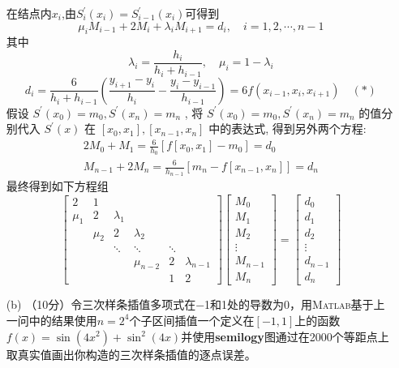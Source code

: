 \documentclass[12pt,a4paper,utf8]{ctexart}
\begin{document}
\begin{enumerate}
		在结点内$x_{i}$,由$S_{i}^{\prime}\left(x_{i}\right)=S_{i-1}^{\prime}\left(x_{i}\right)$可得到\\
		$$\mu_{i} M_{i-1}+2 M_{i}+\lambda_{i} M_{i+1}=d_{i}, \quad i=1,2, \cdots, n-1$$
		其中$$
		\lambda_{i}=\frac{h_{i}}{h_{i}+h_{i-1}}, \quad \mu_{i}=1-\lambda_{i}$$
		$$
		d_{i}=\frac{6}{h_{i}+h_{i-1}}\left(\frac{y_{i+1}-y_{i}}{h_{i}}-\frac{y_{i}-y_{i-1}}{h_{i-1}}\right)=6 f\left(x_{i-1}, x_{i}, x_{i+1}\right)\quad (*)
		$$
		假设 $S^{\prime}\left(x_{0}\right)=m_{0}, S^{\prime}\left(x_{n}\right)=m_{n}$ , 将 $S^{\prime}\left(x_{0}\right)=m_{0}, S^{\prime}\left(x_{n}\right)=m_{n}$ 的值分
		别代入 $S^{\prime}(x)$ 在 $\left[x_{0}, x_{1}\right],\left[x_{n-1}, x_{n}\right]$ 中的表达式, 得到另外两个方程:
		$$
		\begin{array}{c}
			2 M_{0}+M_{1}=\frac{6}{h_{0}}\left[f\left[x_{0}, x_{1}\right]-m_{0}\right]=d_{0} \\
			M_{n-1}+2 M_{n}=\frac{6}{h_{n-1}}\left[m_{n}-f\left[x_{n-1}, x_{n}\right]\right]=d_{n}
		\end{array}
		$$
		最终得到如下方程组
		\[
		\left[\begin{array}{cccccc}
			2 & 1 & & & & \\
			\mu_{1} & 2 & \lambda_{1} & & & \\
			& \mu_{2} & 2 & \lambda_{2} & & \\
			& & \ddots & \ddots & \ddots & \\
			& & & \mu_{n-2} & 2 & \lambda_{n-1} \\
			& & & & 1 & 2
		\end{array}\right]\left[\begin{array}{c}
			M_{0} \\
			M_{1} \\
			M_{2} \\
			\vdots \\
			M_{n-1} \\
			M_{n}
		\end{array}\right]=\left[\begin{array}{c}
			d_{0} \\
			d_{1} \\
			d_{2} \\
			\vdots \\
			d_{n-1} \\
			d_{n}
		\end{array}\right]	
		\]
		\item[(b)]（10分）令三次样条插值多项式在−1和1处的导数为0，用\textsc{Matlab}基于上一问中的结果使用$n = 2^4$个子区间插值一个定义在$[−1, 1]$上的函数$f(x) =\sin(4x^2) + \sin^2(4x)$并使用\textbf{semilogy}图通过在2000个等距点上取真实值画出你构造的三次样条插值的逐点误差。\\

\end{enumerate}
\end{document}

